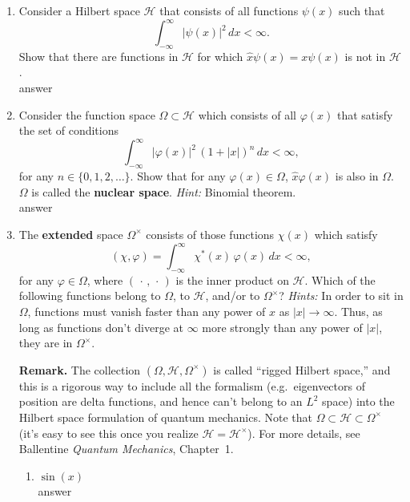 \documentclass[11pt]{article}
\begin{document}
\begin{enumerate}[label=\alph*)]
\item Consider a Hilbert space $\mathcal H$ that consists of all functions $\psi(x)$ such that
\[
\int_{-\infty}^{\infty} |\psi(x)|^2\,dx < \infty .
\]
Show that there are functions in $\mathcal H$ for which $\hat{x}\psi(x)=x\psi(x)$ is not in $\mathcal H$.\\

answer

\item Consider the function space $\Omega \subset \mathcal H$ which consists of all $\varphi(x)$ that satisfy the set of conditions
\[
\int_{-\infty}^{\infty} |\varphi(x)|^2 \,(1+|x|)^n\,dx < \infty,
\]
for any $n\in\{0,1,2,\dots\}$. Show that for any $\varphi(x)\in\Omega$, $\hat{x}\varphi(x)$ is also in $\Omega$. $\Omega$ is called the \textbf{nuclear space}. \emph{Hint:} Binomial theorem.\\

answer
	
\item The \textbf{extended} space $\Omega^\times$ consists of those functions $\chi(x)$ which satisfy
\[
(\chi,\varphi)=\int_{-\infty}^{\infty}\chi^{*}(x)\,\varphi(x)\,dx < \infty,
\]
for any $\varphi\in\Omega$, where $(\,\cdot\,,\,\cdot\,)$ is the inner product on $\mathcal H$. Which of the following functions belong to $\Omega$, to $\mathcal H$, and/or to $\Omega^\times$? \emph{Hints:} In order to sit in $\Omega$, functions must vanish faster than any power of $x$ as $|x|\to\infty$. Thus, as long as functions don’t diverge at $\infty$ more strongly than any power of $|x|$, they are in $\Omega^\times$.

\medskip
\noindent\textbf{Remark.} The collection $(\Omega, \mathcal H, \Omega^\times)$ is called ``rigged Hilbert space,'' and this is a rigorous way to include all the formalism (e.g.\ eigenvectors of position are delta functions, and hence can’t belong to an $L^2$ space) into the Hilbert space formulation of quantum mechanics. Note that $\Omega \subset \mathcal H \subset \Omega^\times$ (it’s easy to see this once you realize $\mathcal H = \mathcal H^\times$). For more details, see Ballentine \emph{Quantum Mechanics}, Chapter~1.

\begin{enumerate}[label=\roman*)]
\item $\sin(x)$\\

	answer


\end{enumerate}
\end{enumerate}
\end{document}

